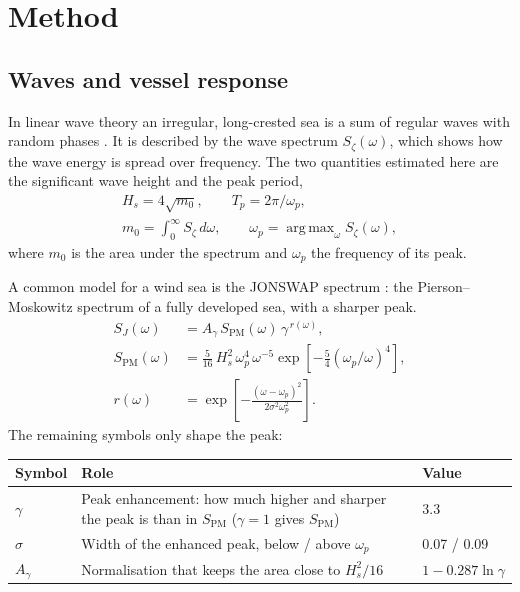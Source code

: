 \documentclass[10pt,a4paper,twocolumn,twoside]{article}
\newcommand{\Hs}{H_{s}}
\newcommand{\Tp}{T_{p}}
\DeclareMathOperator*{\argmax}{arg\,max}
\begin{document}
\section{Method}
\label{sec:method}

\subsection{Waves and vessel response}
\label{sec:theory_waves}

In linear wave theory an irregular, long-crested sea is a sum of regular waves with random phases
\citep{faltinsen1990}. It is described by the wave spectrum $S_\zeta(\omega)$, which shows how the
wave energy is spread over frequency. The two quantities estimated here are the significant wave
height and the peak period,
\begin{equation}
\begin{gathered}
\Hs = 4\sqrt{m_0}, \qquad \Tp = 2\pi/\omega_p, \\
m_0 = \int_0^\infty S_\zeta\,d\omega, \qquad \omega_p = \argmax_\omega S_\zeta(\omega),
\end{gathered}
\label{eq:hs_tp}
\end{equation}
where $m_0$ is the area under the spectrum and $\omega_p$ the frequency of its peak.

A common model for a wind sea is the JONSWAP spectrum \citep{dnv2021c205}: the
Pierson--Moskowitz spectrum of a fully developed sea, with a sharper peak.
\begin{align}
S_J(\omega) &= A_\gamma\, S_{\mathrm{PM}}(\omega)\, \gamma^{\,r(\omega)}, \label{eq:jonswap}\\
S_{\mathrm{PM}}(\omega) &= \tfrac{5}{16}\,\Hs^2\,\omega_p^4\,\omega^{-5}
\exp\!\left[-\tfrac{5}{4}\left(\omega_p/\omega\right)^4\right], \nonumber\\
r(\omega) &= \exp\!\left[-\frac{(\omega-\omega_p)^2}{2\sigma^2\omega_p^2}\right]. \nonumber
\end{align}
The remaining symbols only shape the peak:

\begin{center}\small
\begin{tabularx}{\columnwidth}{@{}l >{\raggedright\arraybackslash}X l@{}}
\toprule
Symbol & Role & Value \\
\midrule
$\gamma$ & Peak enhancement: how much higher and sharper the peak is than in $S_{\mathrm{PM}}$ ($\gamma=1$ gives $S_{\mathrm{PM}}$) & 3.3 \\
$\sigma$ & Width of the enhanced peak, below / above $\omega_p$ & 0.07 / 0.09 \\
$A_\gamma$ & Normalisation that keeps the area close to $\Hs^2/16$ & $1-0.287\ln\gamma$ \\
\bottomrule
\end{tabularx}
\end{center}
\end{document}
